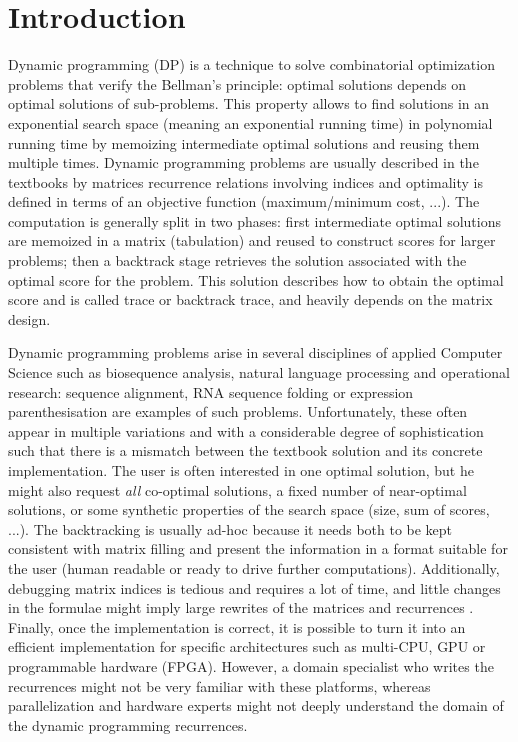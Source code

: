 \newpage
\setcounter{tocdepth}{2} \tableofcontents
\newpage
\section{Introduction} \label{intro}
Dynamic programming (DP) is a technique to solve combinatorial optimization problems that verify the Bellman's principle\cite{bellman_principle}: optimal solutions depends on optimal solutions of sub-problems. This property allows to find solutions in an exponential search space (meaning an exponential running time) in polynomial running time by memoizing intermediate optimal solutions and reusing them multiple times. Dynamic programming problems are usually described in the textbooks by matrices recurrence relations involving indices and optimality is defined in terms of an objective function (maximum/minimum cost, ...). The computation is generally split in two phases: first intermediate optimal solutions are memoized in a matrix (tabulation) and reused to construct scores for larger problems; then a backtrack stage retrieves the solution associated with the optimal score for the problem. This solution describes how to obtain the optimal score and is called trace or backtrack trace, and heavily depends on the matrix design.

Dynamic programming problems arise in several disciplines of applied Computer Science such as biosequence analysis, natural language processing and operational research: sequence alignment, RNA sequence folding or expression parenthesisation are examples of such problems. Unfortunately, these often appear in multiple variations and with a considerable degree of sophistication such that there is a mismatch between the textbook solution and its concrete implementation. The user is often interested in one optimal solution, but he might also request \textit{all} co-optimal solutions, a fixed number of near-optimal solutions, or some synthetic properties of the search space (size, sum of scores, ...). The backtracking is usually ad-hoc because it needs both to be kept consistent with matrix filling and present the information in a format suitable for the user (human readable or ready to drive further computations). Additionally, debugging matrix indices is tedious and requires a lot of time, and little changes in the formulae might imply large rewrites of the matrices and recurrences \cite{gapc_yield}. Finally, once the implementation is correct, it is possible to turn it into an efficient implementation for specific architectures such as multi-CPU, GPU or programmable hardware (FPGA). However, a domain specialist who writes the recurrences might not be very familiar with these platforms, whereas parallelization and hardware experts might not deeply understand the domain of the dynamic programming recurrences.

